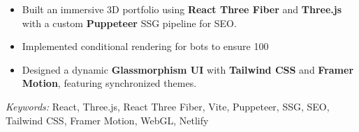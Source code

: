 \nointent
{}

\begin{itemize}
    \item Built an immersive 3D portfolio using \textbf{React Three Fiber} and \textbf{Three.js} with a custom \textbf{Puppeteer} SSG pipeline for SEO.
    \item Implemented conditional rendering for bots to ensure 100%
    \item Designed a dynamic \textbf{Glassmorphism UI} with \textbf{Tailwind CSS} and \textbf{Framer Motion}, featuring synchronized themes.
\end{itemize}

\nointent
\textit{Keywords:} React, Three.js, React Three Fiber, Vite, Puppeteer, SSG, SEO, Tailwind CSS, Framer Motion, WebGL, Netlify

\vspace{1em}
